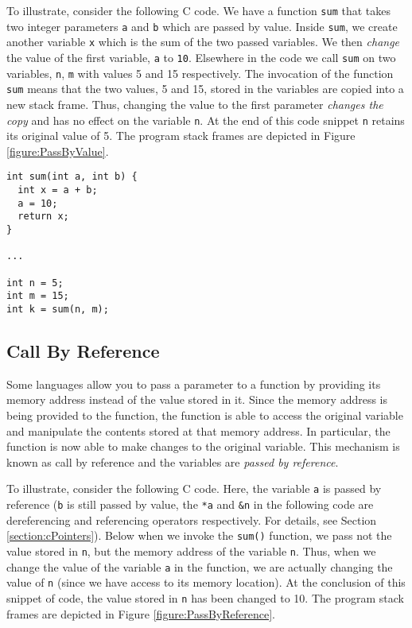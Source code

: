 To illustrate, consider the following C code.  We have a function \texttt{sum}
that takes two integer parameters \texttt{a} and \texttt{b}
which are passed by value.  Inside \texttt{sum}, we create another
variable \texttt{x} which is the sum of the two passed variables.
We then \emph{change} the value of the first variable, \texttt{a}
to \texttt{10}.  Elsewhere in the code we call \texttt{sum}
on two variables, \texttt{n}, \texttt{m} with values
5 and 15 respectively.  The invocation of the function \texttt{sum} 
means that the two values, 5 and 15, stored in the variables are
copied into a new stack frame.  Thus, changing the value to the
first parameter \emph{changes the copy} and has no effect on the
variable \texttt{n}.  At the end of this code snippet \texttt{n}
retains its original value of 5.  The program stack frames are depicted
in Figure \ref{figure:PassByValue}.

\begin{verbatim}
int sum(int a, int b) {
  int x = a + b;
  a = 10;
  return x;
}

...

int n = 5;
int m = 15;
int k = sum(n, m);
\end{verbatim}



\subsection{Call By Reference}

Some languages allow you to pass a parameter to a function by
providing its memory address instead of the value stored in it.  
Since the memory address is being
provided to the function, the function is able to access the original
variable and manipulate the contents stored at that memory address.
In particular, the function is now able to make changes to the original
variable.  This mechanism is known as \gls{call by reference} and 
the variables are \emph{passed by reference}.

To illustrate, consider the following C code. Here, the variable \texttt{a}
is passed by reference (\texttt{b} is still passed by value, 
the \texttt{*a} and \texttt{&n} in the following code
are dereferencing and referencing operators respectively.  For
details, see Section \ref{section:cPointers}).  Below when we
invoke the \texttt{sum()} function, we pass not the value
stored in \texttt{n}, but the memory address of the
variable \texttt{n}.  Thus, when we change the value of
the variable \texttt{a} in the function, we are actually 
changing the value of \texttt{n} (since we have access
to its memory location).  At the conclusion of this snippet of
code, the value stored in \texttt{n} has been changed to
10.  The program stack frames are depicted in Figure \ref{figure:PassByReference}.

